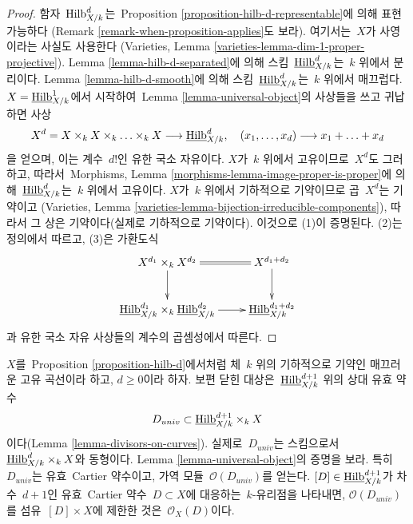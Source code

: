 \begin{proof}
함자\  $\mathrm{Hilb}^d_{X/k}$는\  Proposition
\ref{proposition-hilb-d-representable}에 의해 표현 가능하다
(Remark \ref{remark-when-proposition-applies}도 보라). 여기서는\  $X$가
사영이라는 사실도 사용한다
(Varieties, Lemma \ref{varieties-lemma-dim-1-proper-projective}).
Lemma \ref{lemma-hilb-d-separated}에 의해 스킴\ 
$\underline{\mathrm{Hilb}}^d_{X/k}$는\  $k$ 위에서 분리이다.
Lemma \ref{lemma-hilb-d-smooth}에 의해 스킴\ 
$\underline{\mathrm{Hilb}}^d_{X/k}$는\  $k$ 위에서 매끄럽다.
$X = \underline{\mathrm{Hilb}}^1_{X/k}$에서 시작하여\  Lemma
\ref{lemma-universal-object}의 사상들을 쓰고 귀납하면 사상
$$
X^d = X \times_k X \times_k \ldots \times_k X \longrightarrow
\underline{\mathrm{Hilb}}^d_{X/k},\quad
(x_1, \ldots, x_d) \longrightarrow x_1 + \ldots + x_d
$$
을 얻으며, 이는 계수\  $d!$인 유한 국소 자유이다. $X$가\  $k$ 위에서
고유이므로\  $X^d$도 그러하고, 따라서\  Morphisms, Lemma
\ref{morphisms-lemma-image-proper-is-proper}에 의해\ 
$\underline{\mathrm{Hilb}}^d_{X/k}$는\  $k$ 위에서 고유이다.
$X$가\  $k$ 위에서 기하적으로 기약이므로 곱\  $X^d$는 기약이고
(Varieties, Lemma \ref{varieties-lemma-bijection-irreducible-components}),
따라서 그 상은 기약이다(실제로 기하적으로 기약이다). 이것으로 (1)이
증명된다. (2)는 정의에서 따르고, (3)은 가환도식
$$
\xymatrix{
X^{d_1} \times_k X^{d_2} \ar[d] \ar@{=}[r] & X^{d_1 + d_2} \ar[d] \\
\underline{\Hilbfunctor}^{d_1}_{X/k}
\times_k
\underline{\Hilbfunctor}^{d_2}_{X/k}
\ar[r] &
\underline{\Hilbfunctor}^{d_1 + d_2}_{X/k}
}
$$
과 유한 국소 자유 사상들의 계수의 곱셈성에서 따른다.
\end{proof}

\begin{remark}
\label{remark-universal-object-hilb-d}
$X$를\  Proposition \ref{proposition-hilb-d}에서처럼 체\  $k$ 위의 기하적으로
기약인 매끄러운 고유 곡선이라 하고, $d \geq 0$이라 하자.
보편 닫힌 대상은\  $\underline{\mathrm{Hilb}}^{d + 1}_{X/k}$ 위의 상대 유효
약수
$$
D_{univ} \subset \underline{\mathrm{Hilb}}^{d + 1}_{X/k} \times_k X
$$
이다(Lemma \ref{lemma-divisors-on-curves}). 실제로\  $D_{univ}$는 스킴으로서\ 
$\underline{\mathrm{Hilb}}^d_{X/k} \times_k X$와 동형이다. Lemma
\ref{lemma-universal-object}의 증명을 보라. 특히\  $D_{univ}$는 유효\  Cartier
약수이고, 가역 모듈\  $\mathcal{O}(D_{univ})$를 얻는다.
$[D] \in \underline{\mathrm{Hilb}}^{d + 1}_{X/k}$가 차수\  $d + 1$인 유효\  Cartier 약수\ 
$D \subset X$에 대응하는\  $k$-유리점을 나타내면,
$\mathcal{O}(D_{univ})$를 섬유\  $[D] \times X$에 제한한 것은\ 
$\mathcal{O}_X(D)$이다.
\end{remark}


